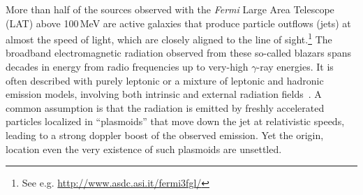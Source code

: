 \documentclass[twocolumn,linenumbers]{aastex62}
\newcommand{\gray}{$\gamma$-ray\xspace}
\newcommand{\Fermi}{\emph{Fermi}\xspace}
\begin{document}
More than half of the sources observed with the \Fermi Large Area Telescope (LAT) above 100\,MeV are active galaxies that produce particle outflows (jets) at almost the speed of light, which are closely aligned to the line of sight.\footnote{See e.g. \url{http://www.asdc.asi.it/fermi3fgl/}}
The broadband electromagnetic radiation observed from these so-called blazars spans decades in energy from radio frequencies up to very-high \gray energies. 
It is often described with purely leptonic or a mixture of leptonic and hadronic emission models, involving both intrinsic and external radiation fields~\cite[e.g.,][and references therein]{Madejski:2016oqg}.
A common assumption is that the radiation is emitted by freshly accelerated   particles localized in ``plasmoids''  that move down the jet at relativistic speeds,
 leading to a strong doppler boost of the observed emission. 
Yet the origin, location even the very existence of such plasmoids are unsettled.
\end{document}
